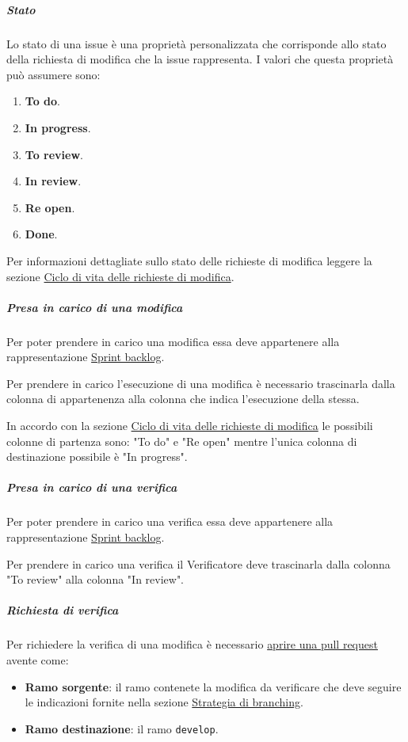 \subparagraph{Stato}
\label{subpar:github_stato}
Lo stato di una issue è una proprietà personalizzata che corrisponde allo stato della richiesta di modifica che la issue rappresenta.
I valori che questa proprietà può assumere sono:
\begin{enumerate}
    \item \textbf{To do}.
    \item \textbf{In progress}.
    \item \textbf{To review}.
    \item \textbf{In review}.
    \item \textbf{Re open}.
    \item \textbf{Done}.
\end{enumerate}
Per informazioni dettagliate sullo stato delle richieste di modifica leggere la sezione \hyperref[par:ciclo_vita_richieste_di_modifica]{Ciclo di vita delle richieste di modifica}.

\subparagraph{Presa in carico di una modifica}
\label{subpar:presa_carico_modifica}
Per poter prendere in carico una modifica essa deve appartenere alla rappresentazione \hyperref[item:sprint_backlog]{Sprint backlog}.

Per prendere in carico l'esecuzione di una modifica è necessario trascinarla dalla colonna di appartenenza alla colonna che indica l'esecuzione della stessa.

In accordo con la sezione \hyperref[par:ciclo_vita_richieste_di_modifica]{Ciclo di vita delle richieste di modifica} le possibili colonne di partenza sono: "To do" e "Re open" mentre l'unica colonna di destinazione possibile è "In progress".

\subparagraph{Presa in carico di una verifica}
\label{subpar:presa_carico_verifica}
Per poter prendere in carico una verifica essa deve appartenere alla rappresentazione \hyperref[item:sprint_backlog]{Sprint backlog}.

Per prendere in carico una verifica il Verificatore deve trascinarla dalla colonna "To review" alla colonna "In review".

\subparagraph{Richiesta di verifica}
\label{subpar:github_richiesta_di_verifica}
Per richiedere la verifica di una modifica è necessario \hyperref[item:creazione_pull_request]{aprire una pull request} avente come:
\begin{itemize}
    \item \textbf{Ramo sorgente}: il ramo contenete la modifica da verificare che deve seguire le indicazioni fornite nella sezione \hyperref[subpar:strategia_di_branching_documenti]{Strategia di branching}.
    
    \item \textbf{Ramo destinazione}: il ramo \texttt{develop}.
\end{itemize}

